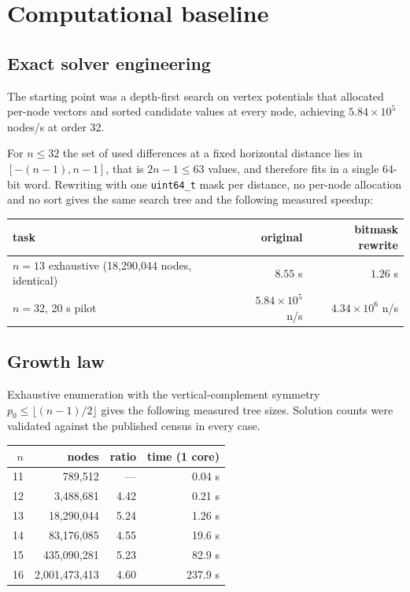 \documentclass[11pt,a4paper]{article}
\theoremstyle{definition}
\begin{document}
\section{Computational baseline}
\label{sec:baseline}

\subsection{Exact solver engineering}

The starting point was a depth-first search on vertex potentials that allocated
per-node vectors and sorted candidate values at every node, achieving
$5.84\times 10^5$ nodes/s at order 32.

For $n\le 32$ the set of used differences at a fixed horizontal distance lies in
$[-(n-1),n-1]$, that is $2n-1 \le 63$ values, and therefore fits in a single
64-bit word. Rewriting with one \texttt{uint64\_t} mask per distance, no
per-node allocation and no sort gives the same search tree and the following
measured speedup:

\begin{center}
\begin{tabular}{@{}lrr@{}}
\toprule
task & original & bitmask rewrite \\
\midrule
$n=13$ exhaustive (18{,}290{,}044 nodes, identical) & $8.55$ s & $1.26$ s \\
$n=32$, 20 s pilot & $5.84\times10^5$ n/s & $4.34\times10^6$ n/s \\
\bottomrule
\end{tabular}
\end{center}

\subsection{Growth law}

Exhaustive enumeration with the vertical-complement symmetry $p_0\le
\lfloor(n-1)/2\rfloor$ gives the following measured tree sizes. Solution counts
were validated against the published census in every case.

\begin{center}
\begin{tabular}{@{}rrrr@{}}
\toprule
$n$ & nodes & ratio & time (1 core) \\
\midrule
11 & 789{,}512 & --- & 0.04 s\\
12 & 3{,}488{,}681 & 4.42 & 0.21 s\\
13 & 18{,}290{,}044 & 5.24 & 1.26 s\\
14 & 83{,}176{,}085 & 4.55 & 19.6 s\\
15 & 435{,}090{,}281 & 5.23 & 82.9 s\\
16 & 2{,}001{,}473{,}413 & 4.60 & 237.9 s\\
\bottomrule
\end{tabular}
\end{center}
\end{document}
